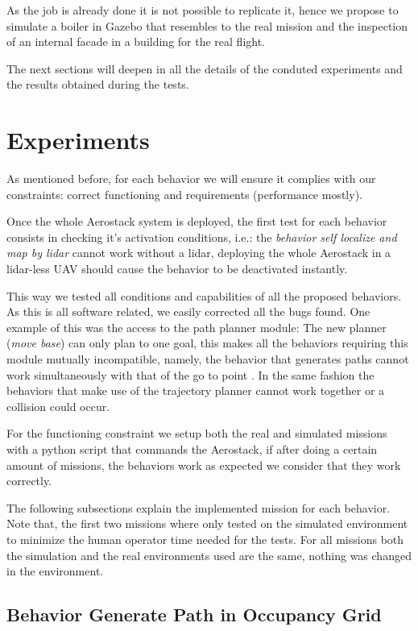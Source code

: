   As the job is already done it is not possible to replicate it, hence we propose to simulate a boiler in Gazebo that resembles to the real mission and the inspection of an internal facade in a building for the real flight.

  The next sections will deepen in all the details of the conduted experiments and the results obtained during the tests.

\section{Experiments} \label{ch_5:sect:experiments}

  As mentioned before, for each behavior we will ensure it complies with our constraints: correct functioning and requirements (performance mostly).
  
  Once the whole Aerostack system is deployed, the first test for each behavior consists in checking it's activation conditions, i.e.: the \textit{behavior self localize and map by lidar} cannot work without a lidar, deploying the whole Aerostack in a lidar-less UAV should cause the behavior to be deactivated instantly.

  This way we tested all conditions and capabilities of all the proposed behaviors. As this is all software related, we easily corrected all the bugs found. One example of this was the access to the path planner module: The new planner (\textit{move base}) can only plan to one goal, this makes all the behaviors requiring this module mutually incompatible, namely, the behavior that generates paths cannot work simultaneously with that of the go to point . In the same fashion the behaviors that make use of the trajectory planner cannot work together or a collision could occur.

  For the functioning constraint we setup both the real and simulated missions with a python script that commands the Aerostack, if after doing a certain amount of missions, the behaviors work as expected we consider that they work correctly. 
  
  The following subsections explain the implemented mission for each behavior. Note that, the first two missions where only tested on the simulated environment to minimize the human operator time needed for the tests. For all missions both the simulation and the real environments used are the same, nothing was changed in the environment.

  \subsection{Behavior Generate Path in Occupancy Grid} \label{ch_5:subsect:behav_genpath_mission}

